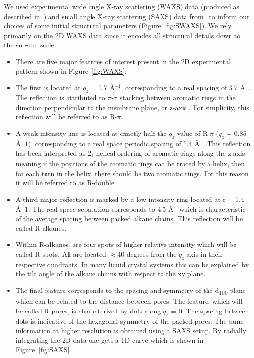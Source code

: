 \documentclass{article}
\newcommand{\angstrom}{\textup{\AA}}
\begin{document}
  We used experimental wide angle X-ray scattering (WAXS) data (produced as described
  in~\cite{feng_scalable_2014}) and small angle X-ray scattering (SAXS) data from~\cite{feng_thin_2016}
  to inform our choices of some initial structural parameters (Figure~\ref{fig:SWAXS}). We rely primarily
  on the 2D WAXS data since it encodes all structural details down to the sub-nm scale.
  \begin{itemize}
        \item There are five major features of interest present in the 2D experimental
        pattern shown in Figure~\ref{fig:WAXS}.
        \item The first is located at $q_z$ = 1.7 \angstrom$^{-1}$,
        corresponding to a real spacing of 3.7 \angstrom~. The reflection is
        attributed to $\pi$-$\pi$ stacking between aromatic rings in the direction
        perpendicular to the membrane plane, or z-axis \cite{feng_scalable_2014}. For simplicity, this
        reflection will be referred to as R-$\pi$.
        \item A weak intensity line is located at exactly half the $q_z$ value of
        R-$\pi$ ($q_z$ = 0.85 \angstrom$^-1$), corresponding to a
        real space periodic spacing of 7.4 \angstrom~. This reflection has been
        interpreted  as 2\textsubscript{1} helical ordering of aromatic rings
        along the z axis meaning if the positions of the aromatic rings can
        be traced by a helix, then for each turn in the helix, there should be
        two aromatic rings. For this reason it will be referred to as R-double.
        \item A third major reflection is marked by a low intensity ring located
        at r = 1.4 \angstrom$^-1$. The real space separation
        corresponds to 4.5 \angstrom~ which is characteristic of the average
        spacing between packed alkane chains. This reflection will be called R-alkanes.
        \item Within R-alkanes, are four spots of higher relative intensity which
        will be called R-spots. All are located $\approx 40$ degrees from the $q_z$ axis
        in their respective quadrants. In many liquid crystal systems this can be
        explained by the tilt angle of the alkane chains with respect to the xy plane. %
        \item The final feature corresponds to the spacing and symmetry of
        the d\textsubscript{100} plane which can be related to the distance between
        pores. The feature, which will be called R-pores, is characterized by dots
        along $q_z$ = 0. The spacing between dots is indicative of the hexagonal
        symmetry of the packed pores. The same information at higher resolution is obtained using a SAXS
        setup. By radially integrating the 2D data one gets a 1D curve which is
        shown in Figure~\ref{fig:SAXS}.  %
  \end{itemize}
\end{document}
